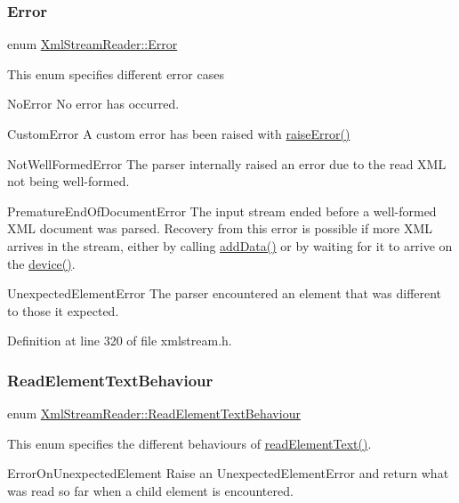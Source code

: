 \subsubsection{\texorpdfstring{Error}{Error}}
{\footnotesize\ttfamily enum \hyperlink{class_xml_stream_reader_ae7aa6749ae6e9de9bcb6f084a9884286}{Xml\+Stream\+Reader\+::\+Error}}

This enum specifies different error cases

No\+Error No error has occurred.

Custom\+Error A custom error has been raised with \hyperlink{class_xml_stream_reader_aae008ac9078fb7edb4a77ba3e76b8dfa}{raise\+Error()}

Not\+Well\+Formed\+Error The parser internally raised an error due to the read X\+ML not being well-\/formed.

Premature\+End\+Of\+Document\+Error The input stream ended before a well-\/formed X\+ML document was parsed. Recovery from this error is possible if more X\+ML arrives in the stream, either by calling \hyperlink{class_xml_stream_reader_add6baa0f8790fc528c1fa6e05755f96b}{add\+Data()} or by waiting for it to arrive on the \hyperlink{class_xml_stream_reader_aa2a751d1b36fac13138b2f370683dfe7}{device()}.

Unexpected\+Element\+Error The parser encountered an element that was different to those it expected. 

Definition at line 320 of file xmlstream.\+h.

\mbox{\label{class_xml_stream_reader_aa67823f6737762b7e1a426ac841e29fa}} 
\subsubsection{\texorpdfstring{Read\+Element\+Text\+Behaviour}{ReadElementTextBehaviour}}
{\footnotesize\ttfamily enum \hyperlink{class_xml_stream_reader_aa67823f6737762b7e1a426ac841e29fa}{Xml\+Stream\+Reader\+::\+Read\+Element\+Text\+Behaviour}}

This enum specifies the different behaviours of \hyperlink{class_xml_stream_reader_a45f936b88df1b72f39c43d1c41fb9940}{read\+Element\+Text()}.

Error\+On\+Unexpected\+Element Raise an Unexpected\+Element\+Error and return what was read so far when a child element is encountered.

